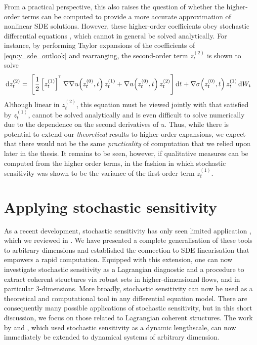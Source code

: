 From a practical perspective, this also raises the question of whether the higher-order terms can be computed to provide a more accurate approximation of nonlinear SDE solutions.
However, these higher-order coefficients obey stochastic differential equations \citep{Blagoveshchenskii_1962_DiffusionProcessesDepending}, which cannot in general be solved analytically.
For instance, by performing Taylor expansions of the coefficients of \cref{eqn:y_sde_outlook} and rearranging, the second-order term \(z_t^{(2)}\) is shown to solve
\[
	\dif z_t^{(2)} = \begin{multlined}[t]
		\left[\frac12 \left[z_t^{(1)}\right]^{\T} \nabla\nabla u\!\left(z_t^{(0)}, t\right) z_t^{(1)} + \nabla u\!\left(z_t^{(0)}, t\right) z_t^{(2)}\right]\dif t + \nabla \sigma\!\left(z_t^{(0)}, t\right) z_t^{(1)}\dif W_t
	\end{multlined}
\]
Although linear in \(z_t^{(2)}\), this equation must be viewed jointly with that satisfied by \(z_t^{(1)}\), cannot be solved analytically and is even difficult to solve numerically due to the dependence on the second derivatives of \(u\).
Thus, while there is potential to extend our \emph{theoretical} results to higher-order expansions, we expect that there would not be the same \emph{practicality} of computation that we relied upon later in the thesis.
It remains to be seen, however, if qualitative measures can be computed from the higher order terms, in the fashion in which stochastic sensitivity was shown to be the variance of the first-order term \(z_t^{(1)}\).


\section{Applying stochastic sensitivity}\label{sec:s2_disc}
As a recent development, stochastic sensitivity has only seen limited application \citep{BadzaEtAl_2023_HowSensitiveAre,Balasuriya_2020_UncertaintyFinitetimeLyapunov,FangEtAl_2020_DisentanglingResolutionPrecision,FangOuellette_2021_AssessingInformationContent}, which we reviewed in .
We have presented a complete generalisation of these tools to arbitrary dimensions and established the connection to SDE linearisation that empowers a rapid computation.
Equipped with this extension, one can now investigate stochastic sensitivity as a Lagrangian diagnostic and a procedure to extract coherent structures via robust sets in higher-dimensional flows, and in particular 3-dimensions.
More broadly, stochastic sensitivity can now be used as a theoretical and computational tool in any differential equation model.
There are consequently many possible applications of stochastic sensitivity, but in this short discussion, we focus on those related to Lagrangian coherent structures.
The work by \citet{FangEtAl_2020_DisentanglingResolutionPrecision} and \citet{FangOuellette_2021_AssessingInformationContent}, which used stochastic sensitivity as a dynamic lengthscale, can now immediately be extended to dynamical systems of arbitrary dimension.

